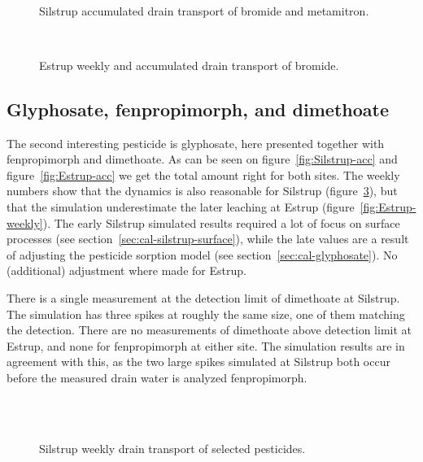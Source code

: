 \begin{figure}[htbp]
  \begin{center}
    \\
  \end{center}
  \caption{Silstrup accumulated drain transport of bromide and metamitron.}
  \label{fig:Silstrup-bromide-acc}
\end{figure}

\begin{figure}[htbp]
  \begin{center}
    \\
  \end{center}
  \caption{Estrup weekly and accumulated drain transport of bromide.}
  \label{fig:Estrup-bromide-drain}
\end{figure}

\FloatBarrier
\subsection{Glyphosate,  fenpropimorph, and dimethoate}

The second interesting pesticide is glyphosate, here presented
together with fenpropimorph and dimethoate.  As can be seen on
figure~\ref{fig:Silstrup-acc} and figure~\ref{fig:Estrup-acc} we get
the total amount right for both sites.  The weekly numbers show that
the dynamics is also reasonable for Silstrup
(figure~\ref{fig:Silstrup-weekly2}), but that the simulation
underestimate the later leaching at Estrup
(figure~\ref{fig:Estrup-weekly}).  The early Silstrup simulated
results required a lot of focus on surface processes (see
section~\ref{sec:cal-silstrup-surface}), while the late values are a
result of adjusting the pesticide sorption model (see
section~\ref{sec:cal-glyphosate}).  No (additional) adjustment where
made for Estrup.

There is a single measurement at the detection limit of dimethoate at
Silstrup.  The simulation has three spikes at roughly the same size,
one of them matching the detection.  There are no measurements of
dimethoate above detection limit at Estrup, and none for fenpropimorph
at either site.  The simulation results are in agreement with this, as
the two large spikes simulated at Silstrup both occur before the
measured drain water is analyzed fenpropimorph.

\begin{figure}[htbp]
  \begin{center}
    \\
    \\
  \end{center}
  \caption{Silstrup weekly drain transport of selected pesticides.}
  \label{fig:Silstrup-weekly2}
\end{figure}


